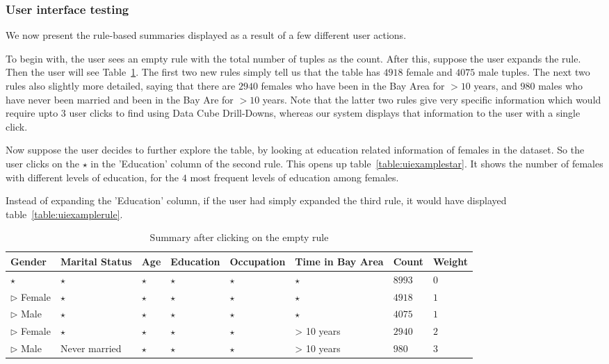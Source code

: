 \subsubsection{User interface testing}
We now present the rule-based summaries displayed as a result of a few different user actions.

To begin with, the user sees an empty rule with the total number of tuples as the count. After this, suppose the user expands the rule. Then the user will see Table~\ref{table:uiexample1}. The first two new rules simply tell us that the table has $4918$ female and $4075$ male tuples. The next two rules also slightly more detailed, saying that there are $2940$ females who have been in the Bay Area for $> 10$ years, and $980$ males who have never been married and been in the Bay Are for $> 10$ years. Note that the latter two rules give very specific information which would require upto $3$ user clicks to find using Data Cube Drill-Downs, whereas our system displays that information to the user with a single click. 

Now suppose the user decides to further explore the table, by looking at education related information of females in the dataset. So the user clicks on the $\star$ in the 'Education' column of the second rule. This opens up table~\ref{table:uiexamplestar}. It shows the number of females with different levels of education, for the $4$ most frequent levels of education among females.

Instead of expanding the 'Education' column, if the user had simply expanded the third rule, it would have displayed table~\ref{table:uiexamplerule}. 

\begin{table} 
\centering 
\begin{tabular}{| p{1.5cm} | p{1.5cm} | p{1.5cm} | p{1.5cm} | p{1.5cm} | p{1.5cm} | l | l |} 
\hline Gender & Marital Status & Age & Education & Occupation & Time in Bay Area & Count & Weight \\ \hline 
\cline{1-8} $\star$ & $\star$ & $\star$ & $\star$ & $\star$ & $\star$ & $8993$ & $0$ \\
\cline{1-1} \cline{2-2} \cline{3-3} \cline{4-4} \cline{5-5} \cline{6-6} \cline{7-8} $\triangleright$ Female & $\star$ & $\star$ & $\star$ & $\star$ & $\star$ & $4918$ & $1$ \\
\cline{1-1} \cline{2-2} \cline{3-3} \cline{4-4} \cline{5-5} \cline{6-6} \cline{7-8} $\triangleright$ Male & $\star$ & $\star$ & $\star$ & $\star$ & $\star$ & $4075$ & $1$ \\
\cline{1-1} \cline{2-2} \cline{3-3} \cline{4-4} \cline{5-5} \cline{6-6} \cline{7-8} $\triangleright$ Female & $\star$ & $\star$ & $\star$ & $\star$ & > 10 years & $2940$ & $2$ \\
\cline{1-1} \cline{2-2} \cline{3-3} \cline{4-4} \cline{5-5} \cline{6-6} \cline{7-8} $\triangleright$ Male & Never married & $\star$ & $\star$ & $\star$ & > 10 years & $980$ & $3$ \\
\hline 
\end{tabular} 
\caption{Summary after clicking on the empty rule \label{table:uiexample1}} 
\end{table} 

